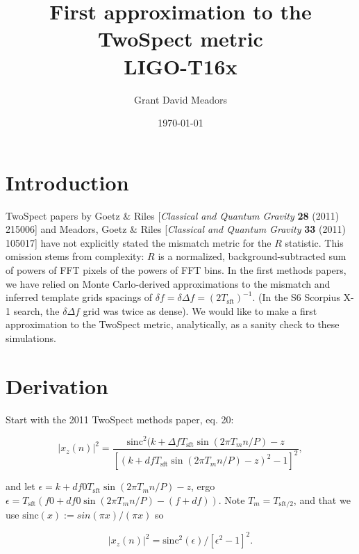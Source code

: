 \documentclass{article}
\begin{document}
\title{First approximation to the TwoSpect metric \\ 
LIGO-T16x}
\author{Grant David Meadors}
\date{\today}

\maketitle

\section{Introduction}

TwoSpect papers by Goetz \& Riles [\textit{Classical and Quantum Gravity} \textbf{28} (2011) 215006] and Meadors, Goetz \& Riles [\textit{Classical and Quantum Gravity} \textbf{33} (2011) 105017] have not explicitly stated the mismatch metric for the $R$ statistic.
This omission stems from complexity: $R$ is a normalized, background-subtracted sum of powers of FFT pixels of the powers of FFT bins.
In the first methods papers, we have relied on Monte Carlo-derived approximations to the mismatch and inferred template grids spacings of $\delta f = \delta \Delta f = (2 T_\mathrm{sft})^{-1}$.
(In the S6 Scorpius X-1 search, the $\delta \Delta f$ grid was twice as dense).
We would like to make a first approximation to the TwoSpect metric, analytically, as a sanity check to these simulations.


\section{Derivation}

Start with the 2011 TwoSpect methods paper, eq. 20:

\begin{equation}
|x_z (n)|^2 = \frac{\mathrm{sinc}^2 (k+ \Delta f T_\mathrm{sft} \sin (2 \pi T_m n / P)-z}{[(k+df T_\mathrm{sft}
              \sin (2 \pi T_m n / P) -z)^2 -1]^2},
\end{equation}

\noindent and let $\epsilon = k+ df0 T_\mathrm{sft} \sin(2\pi T_m n / P)-z$,
ergo $\epsilon = T_\mathrm{sft}(f0+ df0 \sin(2\pi T_m n /P) - (f+df) )$.
Note $T_m = T_\mathrm{sft/2}$, and that
we use $\mathrm{sinc}(x) := sin(\pi x)/(\pi x)$
so

\begin{equation}
|x_z (n)|^2 = \mathrm{sinc}^2(\epsilon)/[\epsilon^2-1]^2.
\end{equation}
\end{document}
